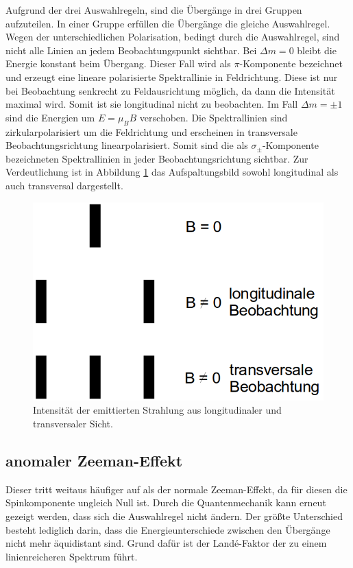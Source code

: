 Aufgrund der drei Auswahlregeln, sind die Übergänge in drei Gruppen aufzuteilen. In einer Gruppe erfüllen die Übergänge die gleiche Auswahlregel. Wegen der unterschiedlichen Polarisation, bedingt durch die Auswahlregel, sind nicht alle Linien an jedem Beobachtungspunkt sichtbar. Bei $\Delta m=0$ bleibt die Energie konstant beim Übergang. Dieser Fall wird als $\pi$-Komponente bezeichnet und erzeugt eine lineare polarisierte Spektrallinie in Feldrichtung. Diese ist nur bei Beobachtung senkrecht zu Feldausrichtung möglich, da dann die Intensität maximal wird. Somit ist sie longitudinal nicht zu beobachten. Im Fall $\Delta m=\pm1$ sind die Energien um $E=\mu_B B$ verschoben. Die Spektrallinien sind zirkularpolarisiert um die Feldrichtung und erscheinen in transversale Beobachtungsrichtung linearpolarisiert. Somit sind die als $\sigma_\pm$-Komponente bezeichneten Spektrallinien in jeder Beobachtungsrichtung sichtbar. Zur Verdeutlichung ist in Abbildung \ref{fig:theorie_3} das Aufspaltungsbild sowohl longitudinal als auch transversal dargestellt.

\begin{figure}[H]
  \centering
  \includegraphics[width=.45\textwidth]{ressources/Beobachtungspunkt.png}
  \caption{Intensität der emittierten Strahlung aus longitudinaler und transversaler Sicht\cite{skript}.}
  \label{fig:theorie_3}
\end{figure}


\subsection{anomaler Zeeman-Effekt}
Dieser tritt weitaus häufiger auf als der normale Zeeman-Effekt, da für diesen die Spinkomponente ungleich Null ist. Durch die Quantenmechanik kann erneut gezeigt werden, dass sich die Auswahlregel nicht ändern. Der größte Unterschied besteht lediglich darin, dass die Energieunterschiede zwischen den Übergänge nicht mehr äquidistant sind. Grund dafür ist der Land\'{e}-Faktor der zu einem linienreicheren Spektrum führt.



